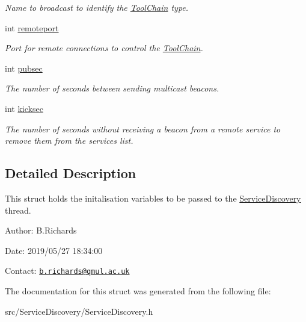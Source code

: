 \begin{DoxyCompactItemize}
\begin{DoxyCompactList}\small\item\em Name to broadcast to identify the \hyperlink{classToolChain}{Tool\-Chain} type. \end{DoxyCompactList}\item 
\hypertarget{structthread__args_a371407c82f7f64e3d9df634e59369565}{int \hyperlink{structthread__args_a371407c82f7f64e3d9df634e59369565}{remoteport}}\label{structthread__args_a371407c82f7f64e3d9df634e59369565}

\begin{DoxyCompactList}\small\item\em Port for remote connections to control the \hyperlink{classToolChain}{Tool\-Chain}. \end{DoxyCompactList}\item 
\hypertarget{structthread__args_aba650f345201e8aece9071377945cf0e}{int \hyperlink{structthread__args_aba650f345201e8aece9071377945cf0e}{pubsec}}\label{structthread__args_aba650f345201e8aece9071377945cf0e}

\begin{DoxyCompactList}\small\item\em The number of seconds between sending multicast beacons. \end{DoxyCompactList}\item 
\hypertarget{structthread__args_a9b75103528b3a6fcc3dfc133cd1b1e8e}{int \hyperlink{structthread__args_a9b75103528b3a6fcc3dfc133cd1b1e8e}{kicksec}}\label{structthread__args_a9b75103528b3a6fcc3dfc133cd1b1e8e}

\begin{DoxyCompactList}\small\item\em The number of seconds without receiving a beacon from a remote service to remove them from the services list. \end{DoxyCompactList}\end{DoxyCompactItemize}


\subsection{Detailed Description}
This struct holds the initalisation variables to be passed to the \hyperlink{classServiceDiscovery}{Service\-Discovery} thread.

\begin{DoxyParagraph}{Author\-:}
B.\-Richards 
\end{DoxyParagraph}
\begin{DoxyParagraph}{Date\-:}
2019/05/27 18\-:34\-:00 
\end{DoxyParagraph}
Contact\-: \href{mailto:b.richards@qmul.ac.uk}{\tt b.\-richards@qmul.\-ac.\-uk} 

The documentation for this struct was generated from the following file\-:\begin{DoxyCompactItemize}
\item 
src/\-Service\-Discovery/Service\-Discovery.\-h\end{DoxyCompactItemize}
